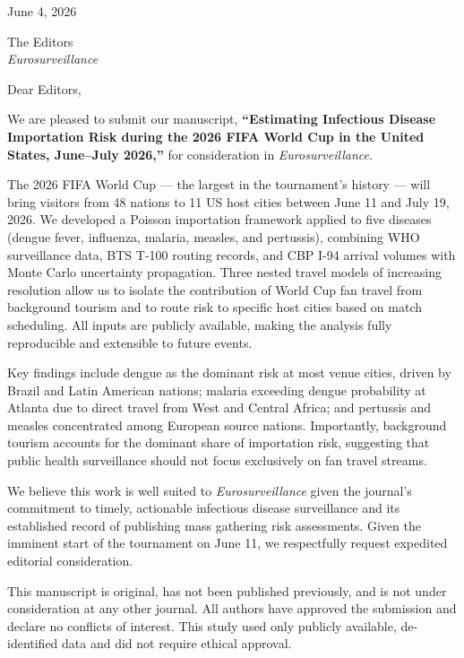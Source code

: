 \documentclass[12pt]{article}
\begin{document}
\thispagestyle{empty}

June 4, 2026

\vspace{0.5cm}

The Editors\\
\textit{Eurosurveillance}

\vspace{0.5cm}

Dear Editors,

\vspace{0.3cm}

We are pleased to submit our manuscript, \textbf{``Estimating Infectious Disease Importation Risk during the 2026 FIFA World Cup in the United States, June--July 2026,''} for consideration in \textit{Eurosurveillance}.

The 2026 FIFA World Cup --- the largest in the tournament's history --- will bring visitors from 48 nations to 11 US host cities between June 11 and July 19, 2026. We developed a Poisson importation framework applied to five diseases (dengue fever, influenza, malaria, measles, and pertussis), combining WHO surveillance data, BTS T-100 routing records, and CBP I-94 arrival volumes with Monte Carlo uncertainty propagation. Three nested travel models of increasing resolution allow us to isolate the contribution of World Cup fan travel from background tourism and to route risk to specific host cities based on match scheduling. All inputs are publicly available, making the analysis fully reproducible and extensible to future events.

Key findings include dengue as the dominant risk at most venue cities, driven by Brazil and Latin American nations; malaria exceeding dengue probability at Atlanta due to direct travel from West and Central Africa; and pertussis and measles concentrated among European source nations. Importantly, background tourism accounts for the dominant share of importation risk, suggesting that public health surveillance should not focus exclusively on fan travel streams.

We believe this work is well suited to \textit{Eurosurveillance} given the journal's commitment to timely, actionable infectious disease surveillance and its established record of publishing mass gathering risk assessments. Given the imminent start of the tournament on June 11, we respectfully request expedited editorial consideration.

This manuscript is original, has not been published previously, and is not under consideration at any other journal. All authors have approved the submission and declare no conflicts of interest. This study used only publicly available, de-identified data and did not require ethical approval.
\end{document}
